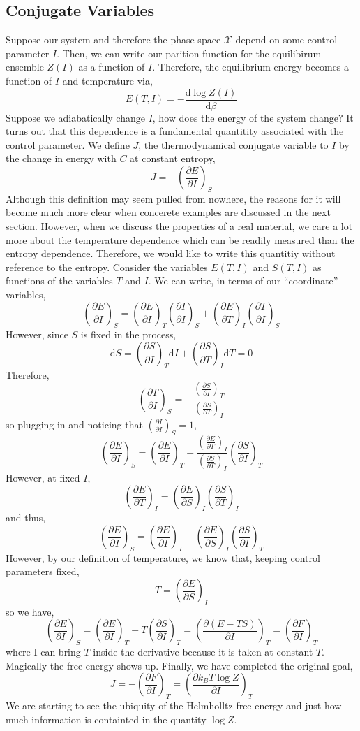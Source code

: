 \documentclass[11pt,a4paper]{article}
\renewcommand{\d}[1]{\mathrm{d}#1}
\newcommand{\deriv}[2]{\frac{\d{#1}}{\d{#2}}}
\newcommand{\cderiv}[3]{\left(\frac{\partial{#1}}{\partial{#2}}\right)_{#3}}
\theoremstyle{theorem}
\theoremstyle{definition}
\theoremstyle{definition}
\theoremstyle{remark}
\theoremstyle{definition}
\theoremstyle{remark}
\newcommand{\phase}{\mathscr{X}}
\begin{document}
\subsection{Conjugate Variables}

Suppose our system and therefore the phase space $\phase$ depend on some control parameter $I$. Then, we can write our parition function for the equilibirum ensemble $Z(I)$ as a function of $I$. Therefore, the equilibrium energy becomes a function of $I$ and temperature via,
\[ E(T, I) = - \deriv{\log{Z(I)}}{\beta} \]
Suppose we adiabatically change $I$, how does the energy of the system change? It turns out that this dependence is a fundamental quantitity associated with the control parameter. We define $J$, the thermodynamical conjugate variable to $I$ by the change in energy with $C$ at constant entropy,
\[ J = - \cderiv{E}{I}{S} \]
Although this definition may seem pulled from nowhere, the reasons for it will become much more clear when concerete examples are discussed in the next section.
However, when we discuss the properties of a real material, we care a lot more about the temperature dependence which can be readily measured than the entropy dependence. Therefore, we would like to write this quantitiy without reference to the entropy. Consider the variables $E(T, I)$ and $S(T, I)$ as functions of the variables $T$ and $I$. We can write, in terms of our ``coordinate'' variables,
\[ \cderiv{E}{I}{S} = \cderiv{E}{I}{T} \cderiv{I}{I}{S} + \cderiv{E}{T}{I} \cderiv{T}{I}{S} \]
However, since $S$ is fixed in the process, 
\[ \d{S} = \cderiv{S}{I}{T} \d{I} + \cderiv{S}{T}{I} \d{T} = 0 \]
Therefore,
\[ \cderiv{T}{I}{S} = - \frac{\cderiv{S}{I}{T}}{\cderiv{S}{T}{I}} \]
so plugging in and noticing that $\cderiv{I}{I}{S} = 1$,
\[ \cderiv{E}{I}{S} = \cderiv{E}{I}{T} - \frac{\cderiv{E}{T}{I}}{\cderiv{S}{T}{I}}
 \cderiv{S}{I}{T} \]
However, at fixed $I$, 
\[ \cderiv{E}{T}{I} = \cderiv{E}{S}{I} \cderiv{S}{T}{I} \]
and thus,
\[ \cderiv{E}{I}{S} = \cderiv{E}{I}{T} - \cderiv{E}{S}{I}
 \cderiv{S}{I}{T} \]
However, by our definition of temperature, we know that, keeping control parameters fixed,
\[ T = \cderiv{E}{S}{I} \]
so we have,
\[\cderiv{E}{I}{S} = \cderiv{E}{I}{T} - T \cderiv{S}{I}{T} = \cderiv{(E - TS)}{I}{T} = \cderiv{F}{I}{T} \]
where I can bring $T$ inside the derivative because it is taken at constant $T$. Magically the free energy shows up. Finally, we have completed the original goal,
\[ J = - \cderiv{F}{I}{T} = \cderiv{k_B T \log{Z}}{I}{T} \]
We are starting to see the ubiquity of the Helmholltz free energy and just how much information is containted in the quantity $\log{Z}$. 
\end{document}
